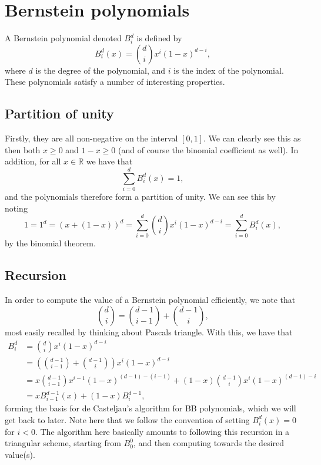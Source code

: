 \section{Bernstein polynomials}

A Bernstein polynomial denoted $B_i^d$ is defined by
\begin{equation}
    B_i^d(x) = \binom{d}{i} x^i (1 - x)^{d - i},
\end{equation}
where $d$ is the degree of the polynomial, and $i$ is the index of the polynomial.
These polynomials satisfy a number of interesting properties.

\subsection{Partition of unity}
Firstly, they are all non-negative on the interval $[0, 1]$.
We can clearly see this as then both $x \geq 0$ and $1 - x \geq 0$ (and of course the binomial coefficient as well).
In addition, for all $x \in \mathbb{R}$ we have that
\begin{equation}
    \sum_{i = 0}^{d} B_i^d(x) = 1,
\end{equation}
and the polynomials therefore form a partition of unity.
We can see this by noting
\begin{equation}
    1
    = 1^d
    = (x + (1 - x))^d
    = \sum_{i = 0}^{d} \binom{d}{i} x^i (1 - x)^{d - i}
    = \sum_{i = 0}^{d} B_i^d(x),
\end{equation}
by the binomial theorem.

\subsection{Recursion}
In order to compute the value of a Bernstein polynomial efficiently, we note that
\begin{equation}
    \binom{d}{i} = \binom{d - 1}{i - 1} + \binom{d - 1}{i},
\end{equation}
most easily recalled by thinking about Pascals triangle.
With this, we have that
\begin{align*}
    B_{i}^{d}
    &= \binom{d}{i} x^i (1 - x)^{d - i} \\
    &= \left(\binom{d - 1}{i - 1} + \binom{d - 1}{i}\right) x^i (1 - x)^{d - i} \\
    &= x \binom{d - 1}{i - 1} x^{i - 1} (1 - x)^{(d - 1) - (i - 1)} + (1 - x) \binom{d - 1}{i} x^i (1 - x)^{(d - 1) - i} \\
    &= x B_{i - 1}^{d - 1}(x) + (1 - x)B_{i}^{d - 1},
\end{align*}
forming the basis for de Casteljau's algorithm for BB polynomials, which we will get back to later.
Note here that we follow the convention of setting $B_i^d(x) = 0$ for $i < 0$.
The algorithm here basically amounts to following this recursion in a triangular scheme, starting from $B_0^0$, and then computing towards the desired value(s). %

